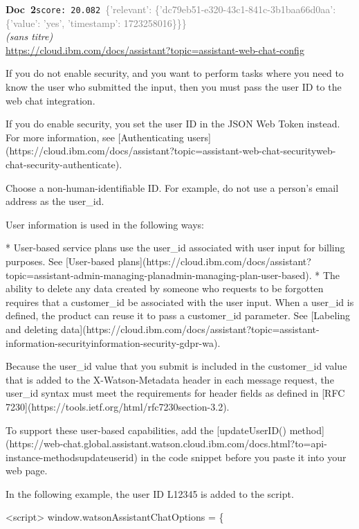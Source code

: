 \documentclass[a4paper,11pt]{article}
\begin{document}
\begin{docenv}
{\footnotesize\textcolor{doccolor}{\textbf{Doc~2}}}\hfill{\tiny\texttt{score:~20.082}}\ {\tiny\textcolor{gray}{\{'relevant': \{'dc79eb51-e320-43c1-841c-3b1baa66d0aa': \{'value': 'yes', 'timestamp': 1723258016\}\}\}}}\\[3pt]
{\small\textit{(sans titre)}}\\[2pt]
{\tiny\url{https://cloud.ibm.com/docs/assistant?topic=assistant-web-chat-config}}\\[4pt]
{\footnotesize 
If you do not enable security, and you want to perform tasks where you need to know the user who submitted the input, then you must pass the user ID to the web chat integration.

If you do enable security, you set the user ID in the JSON Web Token instead. For more information, see [Authenticating users](https://cloud.ibm.com/docs/assistant?topic=assistant-web-chat-securityweb-chat-security-authenticate).

Choose a non-human-identifiable ID. For example, do not use a person's email address as the user\_id.

User information is used in the following ways:



* User-based service plans use the user\_id associated with user input for billing purposes. See [User-based plans](https://cloud.ibm.com/docs/assistant?topic=assistant-admin-managing-planadmin-managing-plan-user-based).
* The ability to delete any data created by someone who requests to be forgotten requires that a customer\_id be associated with the user input. When a user\_id is defined, the product can reuse it to pass a customer\_id parameter. See [Labeling and deleting data](https://cloud.ibm.com/docs/assistant?topic=assistant-information-securityinformation-security-gdpr-wa).

Because the user\_id value that you submit is included in the customer\_id value that is added to the X-Watson-Metadata header in each message request, the user\_id syntax must meet the requirements for header fields as defined in [RFC 7230](https://tools.ietf.org/html/rfc7230section-3.2).



To support these user-based capabilities, add the [updateUserID() method](https://web-chat.global.assistant.watson.cloud.ibm.com/docs.html?to=api-instance-methodsupdateuserid) in the code snippet before you paste it into your web page.

In the following example, the user ID L12345 is added to the script.

<script>
window.watsonAssistantChatOptions = \{}
\end{docenv}
\end{document}
